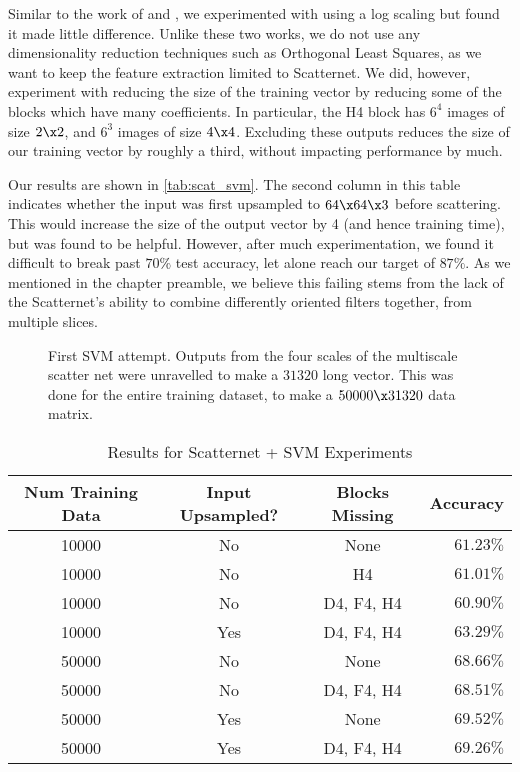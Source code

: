   Similar to the work of \citet{oyallon_deep_2015} and
  \citet{singh_multi-resolution_2016}, we experimented with using a log scaling
  but found it made little difference. Unlike these two works, we do not use
  any dimensionality reduction techniques such as Orthogonal Least Squares, as
  we want to keep the feature extraction limited to Scatternet. We did, however,
  experiment with reducing the size of the training vector by reducing some of
  the blocks which have many coefficients. In particular, the H4 block has
  $6^4$ images of size $2\x 2$, and $6^3$ images of size $4\x 4$. Excluding
  these outputs reduces the size of our training vector by roughly a third,
  without impacting performance by much.

  Our results are shown in \autoref{tab:scat_svm}. The second column in this
  table indicates whether the input was first upsampled to $64\x 64\x 3$ before
  scattering. This would increase the size of the output vector by 4 (and hence
  training time), but was found to be helpful. However, after much
  experimentation, we found it difficult to break past $70\%$ test accuracy,
  let alone reach our target of $87\%$. As we mentioned in the chapter
  preamble, we believe this failing stems from the lack of the Scatternet's
  ability to combine differently oriented filters together, from multiple
  slices.
  
  \begin{figure}
    \centering
      \caption[First SVM attempt]
              {First SVM attempt. Outputs from the four scales of the
              multiscale scatter net were unravelled to make a $31320$ long
              vector. This was done for the entire training dataset, to make
              a $50000\x 31320$ data matrix.}
      \label{fig:svm_1}
  \end{figure}

  \begin{table}
    \caption{Results for Scatternet + SVM Experiments}
    \label{tab:scat_svm}
    \begin{center}
    \begin{tabular}{cccr}\toprule \Tstrut
      \textbf{Num Training Data} & \textbf{Input Upsampled?} & \textbf{Blocks
      Missing} & \textbf{Accuracy} \Bstrut\\ \midrule
      10000 & No & None & $61.23\%$\Tstrut\\
      10000 & No & H4   & $61.01\%$\\
      10000 & No & D4, F4, H4 & $60.90\%$\\
      10000 & Yes & D4, F4, H4 & $63.29\%$\\
      50000 & No & None & $68.66\%$\\
      50000 & No & D4, F4, H4 & $68.51\%$\\
      50000 & Yes & None & $69.52\%$ \\
      50000 & Yes & D4, F4, H4 & $69.26\%$\Bstrut 
    \end{tabular}
    \end{center}
  \end{table}

